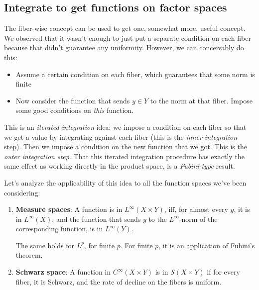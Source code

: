 \documentclass[a4paper]{amsart}
\newcommand{\schwarz}[1]{\mathcal{S}\left(#1\right)}
\begin{document}
\subsection{Integrate to get functions on factor spaces}

The fiber-wise concept can be used to get one, somewhat more, useful
concept. We observed that it wasn't enough to just put a separate
condition on each fiber because that didn't guarantee any
uniformity. However, we can conceivably do this:

\begin{itemize}

\item Assume a certain condition on each fiber, which guarantees that
  some norm is finite

\item Now consider the function that sends $y \in Y$ to the norm at
  that fiber. Impose some good conditions on {\em this} function.

\end{itemize}

This is an {\em iterated integration} idea: we impose a condition on
each fiber so that we get a value by integrating against each fiber
(this is the {\em inner integration} step). Then we impose a condition
on the new function that we got. This is the {\em outer integration
  step}. That this iterated integration procedure has exactly the same
effect as working directly in the product space, is a {\em
  Fubini-type} result.

Let's analyze the applicability of this idea to all the function
spaces we've been considering:

\begin{enumerate}

\item {\bf Measure spaces}: A function is in $L^\infty(X \times Y)$,
  iff, for almost every $y$, it is in $L^\infty(X)$, and the function
  that sends $y$ to the $L^\infty$-norm of the corresponding function,
  is in $L^\infty(Y)$.

  The same holds for $L^p$, for finite $p$. For finite $p$, it is an
  application of Fubini's theorem.

\item {\bf Schwarz space}: A function in $C^\infty(X \times Y)$ is in
  $\schwarz{X \times Y}$ if for every fiber, it is Schwarz, and the
  rate of decline on the fibers is uniform.
\end{enumerate}
\end{document}
